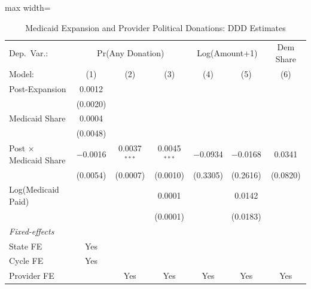 
\begin{table}[htbp]
   \caption{\label{tab:main} Medicaid Expansion and Provider Political Donations: DDD Estimates}
   \centering
   \begin{adjustbox}{max width=\textwidth}
   \begin{tabular}{lcccccc}
      \tabularnewline \midrule \midrule
      Dep.\ Var.: & \multicolumn{3}{c}{Pr(Any Donation)} & \multicolumn{2}{c}{Log(Amount+1)} & Dem Share\\
      Model:                                          & (1)      & (2)            & (3)            & (4)      & (5)      & (6)\\
      \midrule
      Post-Expansion                                  & 0.0012   &                &                &          &          &   \\
                                                      & (0.0020) &                &                &          &          &   \\
      Medicaid Share                                   & 0.0004   &                &                &          &          &   \\
                                                      & (0.0048) &                &                &          &          &   \\
      Post $\times$ Medicaid Share                    & $-$0.0016  & 0.0037$^{***}$ & 0.0045$^{***}$ & $-$0.0934  & $-$0.0168  & 0.0341\\
                                                      & (0.0054) & (0.0007)       & (0.0010)       & (0.3305) & (0.2616) & (0.0820)\\
      Log(Medicaid Paid)                              &          &                & 0.0001         &          & 0.0142   &   \\
                                                      &          &                & (0.0001)       &          & (0.0183) &   \\
      \midrule
      \emph{Fixed-effects}\\
      State FE                                        & Yes      &                &                &          &          & \\
      Cycle FE                                        & Yes      &                &                &          &          & \\
      Provider FE                                     &          & Yes            & Yes            & Yes      & Yes      & Yes\\

\end{tabular}
\end{adjustbox}
\end{table}
